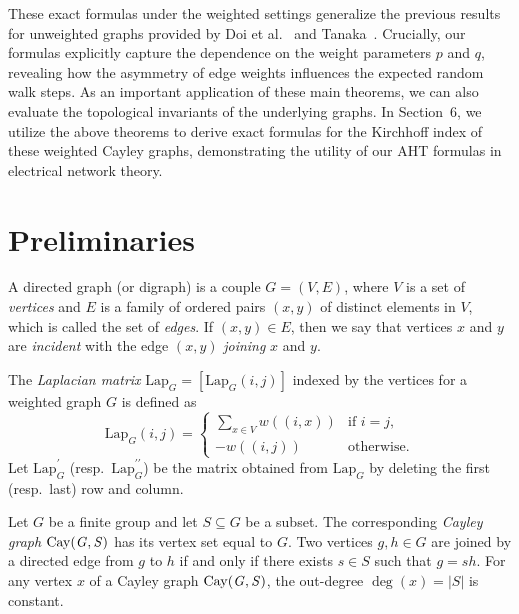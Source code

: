\documentclass[12pt, leqno]{amsart}
\numberwithin{equation}{section}
\theoremstyle{plain}
\theoremstyle{definition}
\newcommand{\Lap}{\mathrm{Lap}}
\newcommand{\0}{\mathbf{0}}
\DeclareMathOperator{\Cay}{Cay}
\begin{document}
These exact formulas under the weighted settings generalize the previous results for unweighted graphs provided by Doi et al.~\cite{HT} and Tanaka~\cite{YT2024}.
Crucially, our formulas explicitly capture the dependence on the weight parameters $p$ and $q$, revealing how the asymmetry of edge weights influences the expected random walk steps.
As an important application of these main theorems, we can also evaluate the topological invariants of the underlying graphs.
In Section~6, we utilize the above theorems to derive exact formulas for the Kirchhoff index of these weighted Cayley graphs, demonstrating the utility of our AHT formulas in electrical network theory.

\section{Preliminaries}

A directed graph (or digraph) is a couple $G=(V,E)$, where $V$ is a set of {\it vertices} and $E$ is a family of ordered pairs $(x,y)$ of distinct elements in $V$, which is called the set of {\it edges}. If $(x,y)\in E$, then we say that vertices $x$ and $y$ are {\it incident} with the edge $(x,y)$ {\it joining} $x$ and $y$.

The {\it Laplacian matrix} $\Lap_G=[\Lap_G(i,j)]$ indexed by the vertices for a weighted graph $G$ is defined as
\[
\Lap_G(i,j)=\begin{cases}
\sum_{x\in V}w((i,x)) &\text{if $i=j$,}\\
-w((i,j)) &\text{otherwise.}
\end{cases}
\]
Let $\Lap_G^{\prime}$ (resp.\ $\Lap_G^{\prime\prime}$) be the matrix obtained from $\Lap_G$ by deleting the first (resp.\ last) row and column. 


Let $G$ be a finite group and let $S\subseteq G$ be a subset.
The corresponding {\it Cayley graph} $\Cay({\it G,S})$ has its vertex set equal to $G$.
Two vertices $g,h\in G$ are joined by a directed edge from $g$ to $h$ if and only if there exists $s\in S$ such that $g=sh$.
For any vertex $x$ of a Cayley graph $\Cay({\it G,S})$, the out-degree $\deg(x)=|S|$ is constant.
\end{document}
